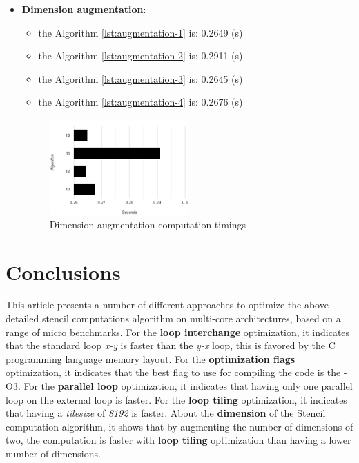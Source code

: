 \documentclass[conference]{IEEEtran}
\begin{document}
\begin{itemize}
\begin{figure}[htbp]
	\end{figure}		
	\item \textbf{Dimension augmentation}: 
	\begin{itemize}
		\item the Algorithm \ref{lst:augmentation-1} is: 0.2649 (s)
		\item the Algorithm \ref{lst:augmentation-2} is: 0.2911 (s)
		\item the Algorithm \ref{lst:augmentation-3} is: 0.2645 (s)
		\item the Algorithm \ref{lst:augmentation-4} is: 0.2676 (s)
	\end{itemize}	
	\begin{figure}[htbp]
		\centering
			\includegraphics[width=0.50\textwidth]{dimension-augmentation.png}
		\caption{Dimension augmentation computation timings}
		\label{fig:dimension-augmentation}
	\end{figure}
\end{itemize}

\section{Conclusions}
This article presents a number of different approaches to optimize the above-detailed stencil computations algorithm on multi-core architectures, based on a
range of micro benchmarks.
For the \textbf{loop interchange} optimization, it indicates that the standard loop \textit{x-y} is faster than the \textit{y-x} loop, this is favored by the C programming language memory layout.
For the \textbf{optimization flags} optimization, it indicates that the best flag to use for compiling the code is the -O3.
For the \textbf{parallel loop} optimization, it indicates that having only one parallel loop on the external loop is faster.
For the \textbf{loop tiling} optimization, it indicates that having a \textit{tile\textunderscore size} of \textit{8192} is faster.
About the \textbf{dimension} of the Stencil computation algorithm, it shows that by augmenting the number of dimensions of two, the computation is faster with \textbf{loop tiling} optimization than having a lower number of dimensions.
\end{document}
